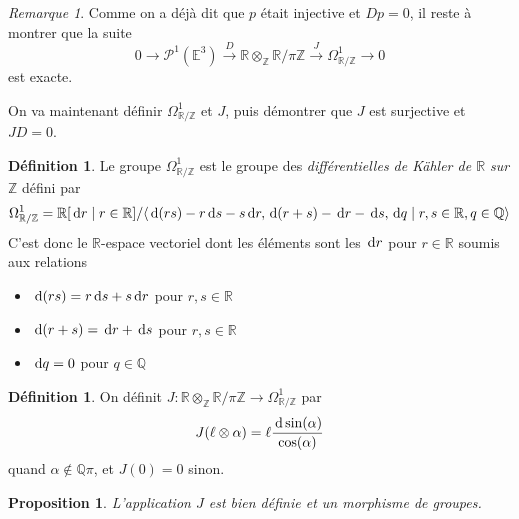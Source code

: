 \documentclass{article}
\newcommand{\Z}{\mathbb{Z}}
\newcommand{\Q}{\mathbb{Q}}
\newcommand{\R}{\mathbb{R}}
\newcommand{\E}{\mathbb{E}}
\renewcommand{\P}{\mathcal{P}}
\renewcommand{\d}{{\rm \, d}}
\theoremstyle{plain}
\newtheorem{proposition}[theorem]{Proposition}
\theoremstyle{definition}
\newtheorem{definition}[theorem]{Définition}
\theoremstyle{remark}
\newtheorem*{remark}{Remarque}
\begin{document}
\begin{remark}
    Comme on a déjà dit que $p$ était injective et $Dp = 0$, il reste à montrer que la suite
    \[0 \to \P^1 (\E^3) \xrightarrow{D} \R \otimes_\Z \R/\pi\Z \xrightarrow{J} \Omega_{\R/\Z}^1 \to 0\]
    est exacte.
\end{remark}

On va maintenant définir $\Omega_{\R/\Z}^1$ et $J$, puis démontrer que $J$ est surjective et $JD = 0$.

\begin{definition}
    Le groupe $\Omega_{\R/\Z}^1$ est le groupe des \emph{différentielles de Kähler de $\R$ sur $\Z$} défini par
    \[\Omega_{\R/\Z}^1 = \R[\d r\mid r \in \R]/\langle \d(rs) - r\d s - s\d r, \d (r+s) - \d r - \d s, \d q \mid r,s \in \R, q \in \Q\rangle\]
    C'est donc le $\R$-espace vectoriel dont les éléments sont les $\d r$ pour $r \in \R$ soumis aux relations
    \begin{itemize}
        \item $\d (rs) = r \d s + s \d r$ pour $r,s \in \R$
        \item $\d (r + s) = \d r + \d s$ pour $r,s \in \R$
        \item $\d q = 0$ pour $q \in \Q$
    \end{itemize}
\end{definition}

\begin{definition}
    On définit $J : \R\otimes_\Z \R/\pi\Z \to \Omega_{\R/\Z}^1$ par
    \[J(\ell \otimes \alpha) = \ell \frac{\d \sin(\alpha)}{\cos(\alpha)}\] quand $\alpha \notin \Q\pi$, et $J(0) = 0$ sinon.
\end{definition}

\begin{proposition}
    L'application $J$ est bien définie et un morphisme de groupes.
\end{proposition}
\end{document}

